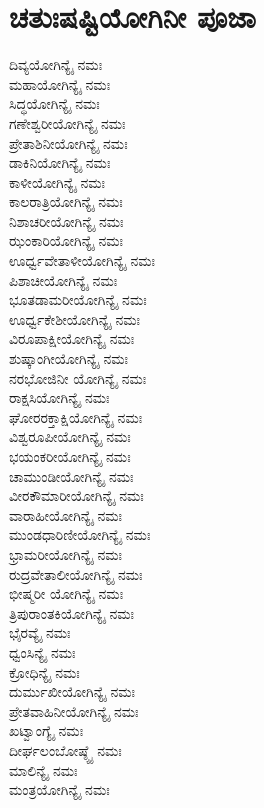 \section{ಚತುಃಷಷ್ಟಿಯೋಗಿನೀ ಪೂಜಾ}
\begin{multicols}{2}
ದಿವ್ಯಯೋಗಿನ್ಯೈ ನಮಃ\\
ಮಹಾಯೋಗಿನ್ಯೈ ನಮಃ\\
ಸಿದ್ಧಯೋಗಿನ್ಯೈ ನಮಃ\\
ಗಣೇಶ್ವರೀಯೋಗಿನ್ಯೈ ನಮಃ\\
ಪ್ರೇತಾಶಿನೀಯೋಗಿನ್ಯೈ ನಮಃ\\
ಡಾಕಿನಿಯೋಗಿನ್ಯೈ ನಮಃ\\
ಕಾಳೀಯೋಗಿನ್ಯೈ ನಮಃ\\
ಕಾಲರಾತ್ರಿಯೋಗಿನ್ಯೈ ನಮಃ\\
ನಿಶಾಚರೀಯೋಗಿನ್ಯೈ ನಮಃ\\
ಝಂಕಾರಿಯೋಗಿನ್ಯೈ ನಮಃ\\
ಊರ್ಧ್ವವೇತಾಳೀಯೋಗಿನ್ಯೈ ನಮಃ\\
ಪಿಶಾಚೀಯೋಗಿನ್ಯೈ ನಮಃ\\
ಭೂತಡಾಮರೀಯೋಗಿನ್ಯೈ ನಮಃ\\
ಊರ್ಧ್ವಕೇಶೀಯೋಗಿನ್ಯೈ ನಮಃ\\
ವಿರೂಪಾಕ್ಷೀಯೋಗಿನ್ಯೈ ನಮಃ\\
ಶುಷ್ಕಾಂಗೀಯೋಗಿನ್ಯೈ ನಮಃ\\
ನರಭೋಜಿನೀ ಯೋಗಿನ್ಯೈ ನಮಃ\\
ರಾಕ್ಷಸಿಯೋಗಿನ್ಯೈ ನಮಃ\\
ಘೋರರಕ್ತಾಕ್ಷಿಯೋಗಿನ್ಯೈ ನಮಃ\\
ವಿಶ್ವರೂಪೀಯೋಗಿನ್ಯೈ ನಮಃ\\
ಭಯಂಕರೀಯೋಗಿನ್ಯೈ ನಮಃ\\
ಚಾಮುಂಡೀಯೋಗಿನ್ಯೈ ನಮಃ\\
ವೀರಕೌಮಾರೀಯೋಗಿನ್ಯೈ ನಮಃ\\
ವಾರಾಹೀಯೋಗಿನ್ಯೈ ನಮಃ\\
ಮುಂಡಧಾರಿಣೀಯೋಗಿನ್ಯೈ ನಮಃ\\
ಭ್ರಾಮರೀಯೋಗಿನ್ಯೈ ನಮಃ\\
ರುದ್ರವೇತಾಲೀಯೋಗಿನ್ಯೈ ನಮಃ\\
ಭೀಷ್ಮರೀ ಯೋಗಿನ್ಯೈ ನಮಃ\\
ತ್ರಿಪುರಾಂತಕಿಯೋಗಿನ್ಯೈ ನಮಃ\\
ಭೈರವ್ಯೈ ನಮಃ\\
ಧ್ವಂಸಿನ್ಯೈ ನಮಃ\\
ಕ್ರೋಧಿನ್ಯೈ ನಮಃ\\
ದುರ್ಮುಖೀಯೋಗಿನ್ಯೈ ನಮಃ\\
ಪ್ರೇತವಾಹಿನೀಯೋಗಿನ್ಯೈ ನಮಃ\\
ಖಟ್ವಾಂಗ್ಯೈ ನಮಃ\\
ದೀರ್ಘಲಂಬೋಷ್ಠ್ಯೈ ನಮಃ\\
ಮಾಲಿನ್ಯೈ ನಮಃ\\
ಮಂತ್ರಯೋಗಿನ್ಯೈ ನಮಃ\\

\end{multicols}
